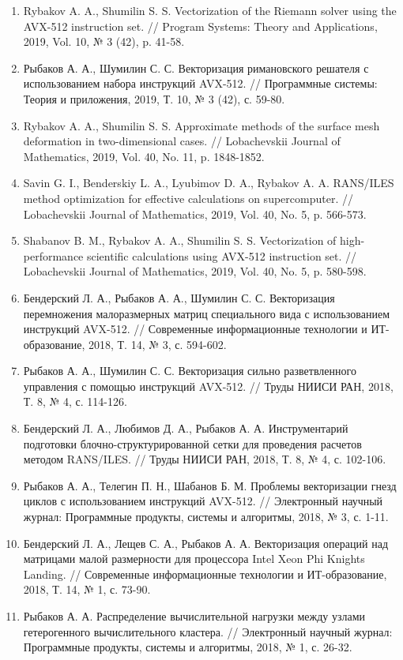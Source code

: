 \documentclass[a4paper,14pt]{extarticle}                     %
\theoremstyle{plain}                                         %
\begin{document}
\begin{enumerate}[noitemsep,topsep=0pt,parsep=0pt,partopsep=0pt]
\item Rybakov A. A., Shumilin S. S. Vectorization of the Riemann solver using the AVX-512 instruction set. // Program Systems: Theory and Applications, 2019, Vol. 10, № 3 (42), p. 41-58.
\item Рыбаков А. А., Шумилин С. С. Векторизация римановского решателя с использованием набора инструкций AVX-512. // Программные системы: Теория и приложения, 2019, Т. 10, № 3 (42), с. 59-80.
\item Rybakov A. A., Shumilin S. S. Approximate methods of the surface mesh deformation in two-dimensional cases. // Lobachevskii Journal of Mathematics, 2019, Vol. 40, No. 11, p. 1848-1852.
\item Savin G. I., Benderskiy L. A., Lyubimov D. A., Rybakov A. A. RANS/ILES method optimization for effective calculations on supercomputer. // Lobachevskii Journal of Mathematics, 2019, Vol. 40, No. 5, p. 566-573.
\item Shabanov B. M., Rybakov A. A., Shumilin S. S. Vectorization of high-performance scientific calculations using AVX-512 instruction set. // Lobachevskii Journal of Mathematics, 2019, Vol. 40, No. 5, p. 580-598.
\item Бендерский Л. А., Рыбаков А. А., Шумилин С. С. Векторизация перемножения малоразмерных матриц специального вида с использованием инструкций AVX-512. // Современные информационные технологии и ИТ-образование, 2018, Т. 14, № 3, с. 594-602.
\item Рыбаков А. А., Шумилин С. С. Векторизация сильно разветвленного управления с помощью инструкций AVX-512. // Труды НИИСИ РАН, 2018, Т. 8, № 4, с. 114-126.
\item Бендерский Л. А., Любимов Д. А., Рыбаков А. А. Инструментарий подготовки блочно-структурированной сетки для проведения расчетов методом RANS/ILES. // Труды НИИСИ РАН, 2018, Т. 8, № 4, с. 102-106.
\item Рыбаков А. А., Телегин П. Н., Шабанов Б. М. Проблемы векторизации гнезд циклов с использованием инструкций AVX-512. // Электронный научный журнал: Программные продукты, системы и алгоритмы, 2018, № 3, с. 1-11.
\item Бендерский Л. А., Лещев С. А., Рыбаков А. А. Векторизация операций над матрицами малой размерности для процессора Intel Xeon Phi Knights Landing. // Современные информационные технологии и ИТ-образование, 2018, Т. 14, № 1, с. 73-90.
\item Рыбаков А. А. Распределение вычислительной нагрузки между узлами гетерогенного вычислительного кластера. // Электронный научный журнал: Программные продукты, системы и алгоритмы, 2018, № 1, с. 26-32.

\end{enumerate}
\end{document}
